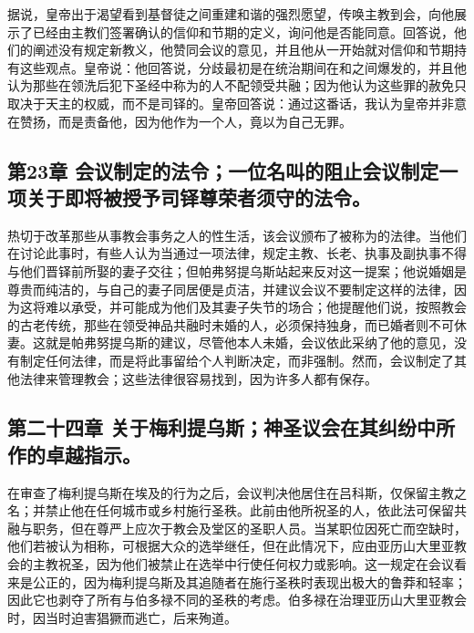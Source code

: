 据说，皇帝出于渴望看到基督徒之间重建和谐的强烈愿望，传唤主教到会，向他展示了已经由主教们签署确认的信仰和节期的定义，询问他是否能同意。回答说，他们的阐述没有规定新教义，他赞同会议的意见，并且他从一开始就对信仰和节期持有这些观点。皇帝说：他回答说，分歧最初是在统治期间在和之间爆发的，并且他认为那些在领洗后犯下圣经中称为的人不配领受共融；因为他认为这些罪的赦免只取决于天主的权威，而不是司铎的。皇帝回答说：通过这番话，我认为皇帝并非意在赞扬，而是责备他，因为他作为一个人，竟以为自己无罪。\par


\subsection{第23章 会议制定的法令；一位名叫的阻止会议制定一项关于即将被授予司铎尊荣者须守的法令。}

热切于改革那些从事教会事务之人的性生活，该会议颁布了被称为的法律。当他们在讨论此事时，有些人认为当通过一项法律，规定主教、长老、执事及副执事不得与他们晋铎前所娶的妻子交往；但帕弗努提乌斯站起来反对这一提案；他说婚姻是尊贵而纯洁的，与自己的妻子同居便是贞洁，并建议会议不要制定这样的法律，因为这将难以承受，并可能成为他们及其妻子失节的场合；他提醒他们说，按照教会的古老传统，那些在领受神品共融时未婚的人，必须保持独身，而已婚者则不可休妻。这就是帕弗努提乌斯的建议，尽管他本人未婚，会议依此采纳了他的意见，没有制定任何法律，而是将此事留给个人判断决定，而非强制。然而，会议制定了其他法律来管理教会；这些法律很容易找到，因为许多人都有保存。\par


\subsection{第二十四章 关于梅利提乌斯；神圣议会在其纠纷中所作的卓越指示。}

在审查了梅利提乌斯在埃及的行为之后，会议判决他居住在吕科斯，仅保留主教之名；并禁止他在任何城市或乡村施行圣秩。此前由他所祝圣的人，依此法可保留共融与职务，但在尊严上应次于教会及堂区的圣职人员。当某职位因死亡而空缺时，他们若被认为相称，可根据大众的选举继任，但在此情况下，应由亚历山大里亚教会的主教祝圣，因为他们被禁止在选举中行使任何权力或影响。这一规定在会议看来是公正的，因为梅利提乌斯及其追随者在施行圣秩时表现出极大的鲁莽和轻率；因此它也剥夺了所有与伯多禄不同的圣秩的考虑。伯多禄在治理亚历山大里亚教会时，因当时迫害猖獗而逃亡，后来殉道。\par

